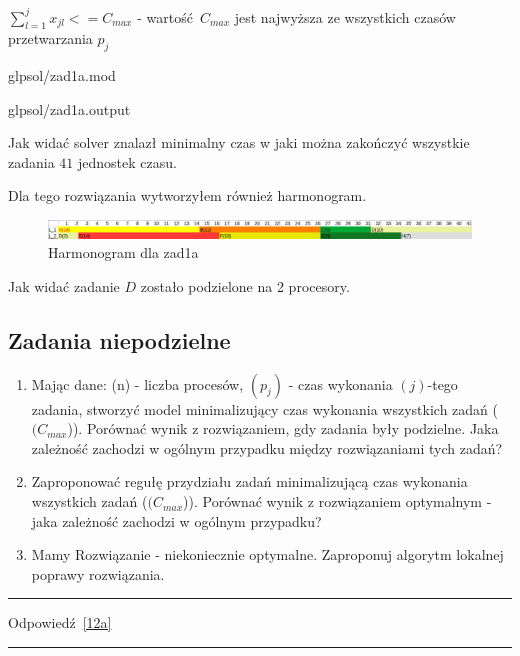 \documentclass{article}
\begin{document}
$\sum^{j}_{l = 1} x_{jl} <= C_{max}$ - wartość $C_{max}$ jest najwyższa ze wszystkich czasów przetwarzania $p_j$


{glpsol/zad1a.mod}


{glpsol/zad1a.output}

Jak widać solver znalazł minimalny czas w jaki można zakończyć wszystkie zadania $41$ jednostek czasu.

Dla tego rozwiązania wytworzyłem również harmonogram.

\begin{figure}[h]    
  \centering    
  \includegraphics[width=\linewidth]{others/zad1a_harmonogram.png}
  \caption{Harmonogram dla zad1a}
\end{figure}

Jak widać zadanie $D$ zostało podzielone na 2 procesory.

\subsection{Zadania niepodzielne}

\begin{enumerate}[label=(\alph*)]
    \item \label{12a} Mając dane: (n) - liczba procesów, $(p_j)$ - czas wykonania
          $(j)$-tego zadania, stworzyć model minimalizujący czas wykonania
          wszystkich zadań ($(C_{max}$)). Porównać wynik z rozwiązaniem,
          gdy zadania były podzielne.
          Jaka zależność zachodzi w ogólnym przypadku między rozwiązaniami tych zadań?
  \item \label{12b} Zaproponować regułę przydziału zadań minimalizującą czas
          wykonania wszystkich zadań ($(C_{max}$)).
          Porównać wynik z rozwiązaniem optymalnym - jaka zależność zachodzi w ogólnym przypadku?
  \item \label{12c} Mamy Rozwiązanie - niekoniecznie optymalne. Zaproponuj algorytm lokalnej poprawy rozwiązania.
\end{enumerate}

\par\noindent\rule{\textwidth}{0.4pt}
Odpowiedź \ref{12a}
\par\noindent\rule{\textwidth}{0.4pt}
\end{document}
